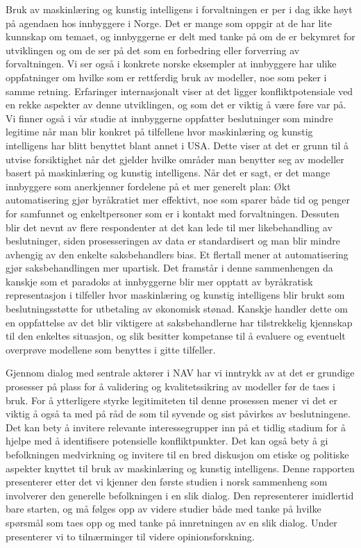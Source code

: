 \documentclass[
  12pt,
  a4paper, 12pt]{article}
\begin{document}
Bruk av maskinlæring og kunstig intelligens i forvaltningen er per i dag ikke høyt på agendaen hos innbyggere i Norge.
Det er mange som oppgir at de har lite kunnskap om temaet, og innbyggerne er delt med tanke på om de er bekymret for utviklingen og om de ser på det som en forbedring eller forverring av forvaltningen.
Vi ser også i konkrete norske eksempler at innbyggere har ulike oppfatninger om hvilke som er rettferdig bruk av modeller, noe som peker i samme retning.
Erfaringer internasjonalt viser at det ligger konfliktpotensiale ved en rekke aspekter av denne utviklingen, og som det er viktig å være føre var på.
Vi finner også i vår studie at innbyggerne oppfatter beslutninger som mindre legitime når man blir konkret på tilfellene hvor maskinlæring og kunstig intelligens har blitt benyttet blant annet i USA.
Dette viser at det er grunn til å utvise forsiktighet når det gjelder hvilke områder man benytter seg av modeller basert på maskinlæring og kunstig intelligens.
Når det er sagt, er det mange innbyggere som anerkjenner fordelene på et mer generelt plan:
Økt automatisering gjør byråkratiet mer effektivt, noe som sparer både tid og penger for samfunnet og enkeltpersoner som er i kontakt med forvaltningen.
Dessuten blir det nevnt av flere respondenter at det kan lede til mer likebehandling av beslutninger, siden prosesseringen av data er standardisert og man blir mindre avhengig av den enkelte saksbehandlers bias.
Et flertall mener at automatisering gjør saksbehandlingen mer upartisk.
Det framstår i denne sammenhengen da kanskje som et paradoks at innbyggerne blir mer opptatt av byråkratisk representasjon i tilfeller hvor maskinlæring og kunstig intelligens blir brukt som beslutningsstøtte for utbetaling av økonomisk stønad.
Kanskje handler dette om en oppfattelse av det blir viktigere at saksbehandlerne har tilstrekkelig kjennskap til den enkeltes situasjon, og slik besitter kompetanse til å evaluere og eventuelt overprøve modellene som benyttes i gitte tilfeller.

Gjennom dialog med sentrale aktører i NAV har vi inntrykk av at det er grundige prosesser på plass for å validering og kvalitetssikring av modeller før de taes i bruk.
For å ytterligere styrke legitimiteten til denne prosessen mener vi det er viktig å også ta med på råd de som til syvende og sist påvirkes av beslutningene.
Det kan bety å invitere relevante interessegrupper inn på et tidlig stadium for å hjelpe med å identifisere potensielle konfliktpunkter.
Det kan også bety å gi befolkningen medvirkning og invitere til en bred diskusjon om etiske og politiske aspekter knyttet til bruk av maskinlæring og kunstig intelligens.
Denne rapporten presenterer etter det vi kjenner den første studien i norsk sammenheng som involverer den generelle befolkningen i en slik dialog.
Den representerer imidlertid bare starten, og må følges opp av videre studier både med tanke på hvilke spørsmål som taes opp og med tanke på innretningen av en slik dialog.
Under presenterer vi to tilnærminger til videre opinionsforskning.
\end{document}
